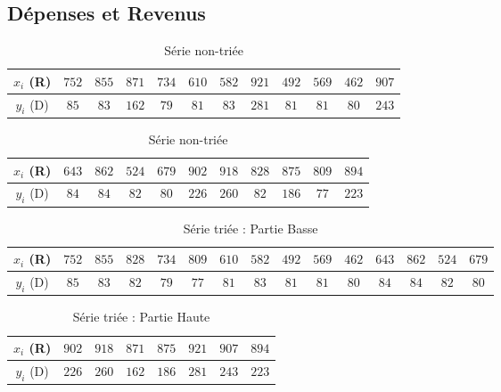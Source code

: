 \documentclass{report}
\begin{document}
      \subsection{Dépenses et Revenus}
      \begin{table}[h]
	\begin{tabular}{| c | c | c | c | c | c | c | c | c | c | c | c |}
	  \hline 
	  $x_{i}$ (R) & $752$ & $855$ & $871$ & $734$ & $610$ & $582$ & $921$ & $492$ & $569$ & $462$ & $907 $ \\ 
	  \hline 
	  $y_{i}$ (D) & $85$ & $83$ & $162$ & $79$ & $81$ & $83$ & $281$ & $81$ & $81$ & $80$ & $243 $ \\ 
	  \hline 
	\end{tabular}
	\newline
	\begin{tabular}{| c | c | c | c | c | c | c | c | c | c | c |}
	\hline 
	$x_{i}$ (R) & $643$ & $862$ & $524$ & $679$ & $902$ & $918$ & $828$ & $875$ & $809$ & $894$ \\ 
	\hline 
	$y_{i}$ (D) & $84$ & $84$ & $82$ & $80$ & $226$ & $260$ & $82$ & $186$ & $77$ & $223$ \\ 
	\hline 
	\end{tabular}
	\caption{Série non-triée}
	\label{inter_tp2_ex3_depenses}
      \end{table}
      
      \begin{table}[h]
	\centering
	\begin{tabular}{| c | c | c | c | c | c | c | c | c | c | c | c | c | c | c |}
	  \hline 
	  $x_{i}$ (R) & $752$ & $855$ & $828$ & $734$ & $809$ & $610$ & $582$ & $492$ & $569$ & $462$ & $643$ & $862$ & $524$ & $679$ \\ 
	  \hline 
	  $y_{i}$ (D) & $85$ & $83$ & $82$ & $79$ & $77$ & $81$ & $83$ & $81$ & $81$ & $80$ & $84$ & $84$ & $82$ & $80$ \\ 
	  \hline 
	\end{tabular}
	\caption{Série triée : Partie Basse}
	\label{inter_tp2_ex3_depenses_bas}
      \end{table}
      \begin{table}[h]
	\centering
	\begin{tabular}{| c | c | c | c | c | c | c | c |}
	  \hline 
	  $x_{i}$ (R) & $902$ & $918$ & $871$ & $875$ & $921$ & $907$ & $894$ \\ 
	  \hline 
	  $y_{i}$ (D) & $226$ & $260$ & $162$ & $186$ & $281$ & $243$ & $223$ \\ 
	  \hline 
	\end{tabular}
	\caption{Série triée : Partie Haute}
	\label{inter_tp2_ex3_depenses_haut}
      \end{table}
      
\end{document}
